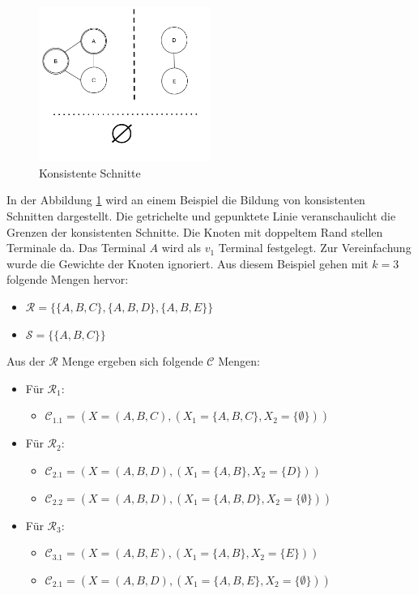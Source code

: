\begin{figure}
  \centering
    \includegraphics[width=0.5\textwidth]{./imgs/terminal_v1.png}
  	\caption{Konsistente Schnitte}
	\label{fig:st_cut}
\end{figure}

In der Abbildung \ref{fig:st_cut} wird an einem Beispiel die Bildung von konsistenten Schnitten dargestellt. Die getrichelte und gepunktete Linie veranschaulicht die Grenzen der konsistenten Schnitte. Die Knoten mit doppeltem Rand stellen Terminale da. Das Terminal $A$ wird als $v_1$ Terminal festgelegt. Zur Vereinfachung wurde die Gewichte der Knoten ignoriert.
Aus diesem Beispiel gehen mit $k=3$ folgende Mengen hervor:
\begin{itemize}
\item $\mathcal{R} = \{\{A,B,C\}, \{A,B,D\}, \{A,B,E\}\}$
\item $\mathcal{S} = \{\{A,B,C\}\}$
\end{itemize}

Aus der $\mathcal{R}$ Menge ergeben sich folgende $\mathcal{C}$ Mengen:
\begin{itemize}
\item Für $\mathcal{R}_1$:
\begin{itemize}
\item $\mathcal{C}_{1.1} = (X=(A,B,C),  (X_1=\{A,B,C\}, X_2=\{\emptyset\}))$
\end{itemize}
\item Für $\mathcal{R}_2$:
\begin{itemize}
\item $\mathcal{C}_{2.1} = (X=(A,B,D),  (X_1=\{A,B\}, X_2=\{D\}))$
\item $\mathcal{C}_{2.2} = (X=(A,B,D),  (X_1=\{A,B,D\}, X_2=\{\emptyset\}))$ 
\end{itemize}
\item Für $\mathcal{R}_3$:
\begin{itemize}
\item $\mathcal{C}_{3.1} = (X=(A,B,E),  (X_1=\{A,B\}, X_2=\{E\}))$
\item $\mathcal{C}_{2.1} = (X=(A,B,D),  (X_1=\{A,B,E\}, X_2=\{\emptyset\}))$
\end{itemize}
\end{itemize}

